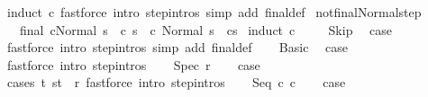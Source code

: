 \begin{isabellebody}
%
\isadelimproof
%
\endisadelimproof
%
\isatagproof
{}\isamarkupfalse%
\ {\isacharparenleft}induct\ c{\isacharparenright}\ {\isacharparenleft}fastforce\ intro{\isacharcolon}\ step{\isachardot}intros\ simp\ add{\isacharcolon}\ final{\isacharunderscore}def{\isacharparenright}{\isacharplus}%
\endisatagproof
{\isafoldproof}%
%
\isadelimproof
\isanewline
%
\endisadelimproof
\isanewline
{}\isamarkupfalse%
\ not{\isacharunderscore}final{\isacharunderscore}Normal{\isacharunderscore}step{\isacharcolon}\ \isanewline
\ \ {\isachardoublequoteopen}{\isasymnot}\ final\ {\isacharparenleft}c{\isacharcomma}Normal\ s{\isacharparenright}\ {\isasymLongrightarrow}\ {\isasymexists}c{\isacharprime}\ s{\isacharprime}{\isachardot}\ {\isasymGamma}{\isasymturnstile}\ {\isacharparenleft}c{\isacharcomma}\ Normal\ s{\isacharparenright}\ {\isasymrightarrow}\ {\isacharparenleft}c{\isacharprime}{\isacharcomma}s{\isacharprime}{\isacharparenright}{\isachardoublequoteclose}\isanewline
%
\isadelimproof
%
\endisadelimproof
%
\isatagproof
{}\isamarkupfalse%
\ {\isacharparenleft}induct\ c{\isacharparenright}\ \isanewline
\ \ \isamarkupfalse%
\ Skip\ \isamarkupfalse%
\ {\isacharquery}case\ \isamarkupfalse%
\ {\isacharparenleft}fastforce\ intro{\isacharcolon}\ step{\isachardot}intros\ simp\ add{\isacharcolon}\ final{\isacharunderscore}def{\isacharparenright}\isanewline
{}\isamarkupfalse%
\isanewline
\ \ \isamarkupfalse%
\ Basic\ \isamarkupfalse%
\ {\isacharquery}case\ \isamarkupfalse%
\ {\isacharparenleft}fastforce\ intro{\isacharcolon}\ step{\isachardot}intros{\isacharparenright}\isanewline
{}\isamarkupfalse%
\isanewline
\ \ \isamarkupfalse%
\ {\isacharparenleft}Spec\ r{\isacharparenright}\isanewline
\ \ \isamarkupfalse%
\ {\isacharquery}case\isanewline
\ \ \ \ \isamarkupfalse%
\ {\isacharparenleft}cases\ {\isachardoublequoteopen}{\isasymexists}t{\isachardot}\ {\isacharparenleft}s{\isacharcomma}t{\isacharparenright}\ {\isasymin}\ r{\isachardoublequoteclose}{\isacharparenright}\ {\isacharparenleft}fastforce\ intro{\isacharcolon}\ step{\isachardot}intros{\isacharparenright}{\isacharplus}\isanewline
{}\isamarkupfalse%
\isanewline
\ \ \isamarkupfalse%
\ {\isacharparenleft}Seq\ c\ c\isanewline
\ \ \isamarkupfalse%
\ {\isacharquery}case\isanewline
\ \ \ \ \isamarkupfalse%

\end{isabellebody}
